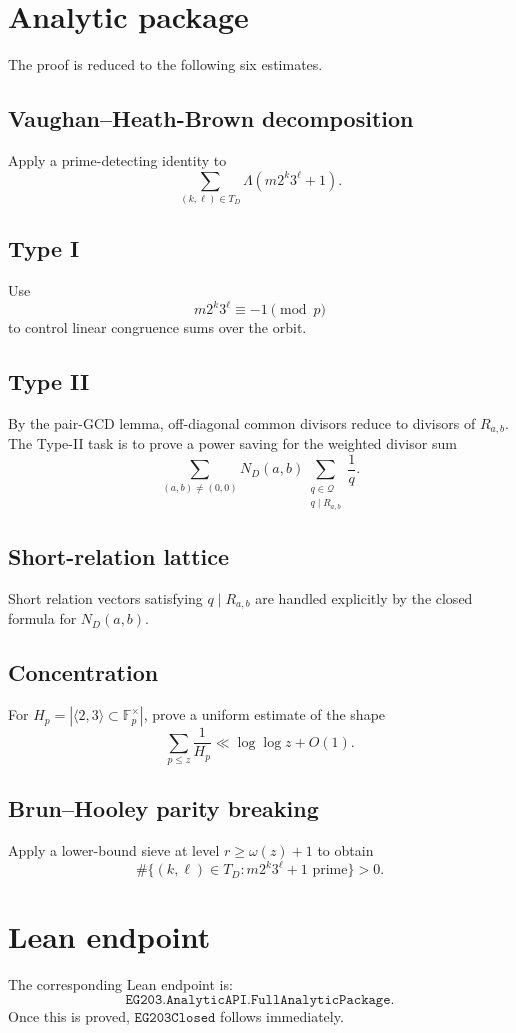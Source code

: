 \documentclass[11pt]{article}
\begin{document}
\section{Analytic package}

The proof is reduced to the following six estimates.

\subsection{Vaughan--Heath-Brown decomposition}
Apply a prime-detecting identity to
\[
\sum_{(k,\ell)\in T_D}\Lambda(m2^k3^\ell+1).
\]

\subsection{Type I}
Use
\[
m2^k3^\ell\equiv -1\pmod p
\]
to control linear congruence sums over the orbit.

\subsection{Type II}
By the pair-GCD lemma, off-diagonal common divisors reduce to divisors of
\(R_{a,b}\).  The Type-II task is to prove a power saving for the weighted
divisor sum
\[
\sum_{(a,b)\ne(0,0)}N_D(a,b)
\sum_{\substack{q\in \mathcal Q\\q\mid R_{a,b}}}\frac1q.
\]

\subsection{Short-relation lattice}
Short relation vectors satisfying \(q\mid R_{a,b}\) are handled explicitly by
the closed formula for \(N_D(a,b)\).

\subsection{Concentration}
For \(H_p=|\langle2,3\rangle\subset \mathbb F_p^\times|\), prove a uniform
estimate of the shape
\[
\sum_{p\le z}\frac1{H_p}\ll \log\log z+O(1).
\]

\subsection{Brun--Hooley parity breaking}
Apply a lower-bound sieve at level \(r\ge\omega(z)+1\) to obtain
\[
\#\{(k,\ell)\in T_D:m2^k3^\ell+1\text{ prime}\}>0.
\]

\section{Lean endpoint}
The corresponding Lean endpoint is:
\[
\texttt{EG203.AnalyticAPI.FullAnalyticPackage}.
\]
Once this is proved, \(\texttt{EG203Closed}\) follows immediately.
\end{document}
